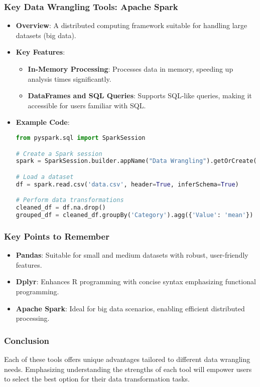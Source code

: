 \documentclass[aspectratio=169]{beamer}
\begin{document}
\begin{frame}[fragile]
    \frametitle{Key Data Wrangling Tools: Apache Spark}
    \begin{itemize}
        \item \textbf{Overview}: A distributed computing framework suitable for handling large datasets (big data).
        \item \textbf{Key Features}:
        \begin{itemize}
            \item \textbf{In-Memory Processing}: Processes data in memory, speeding up analysis times significantly.
            \item \textbf{DataFrames and SQL Queries}: Supports SQL-like queries, making it accessible for users familiar with SQL.
        \end{itemize}
        \item \textbf{Example Code}:
        \begin{lstlisting}[language=Python]
from pyspark.sql import SparkSession

# Create a Spark session
spark = SparkSession.builder.appName("Data Wrangling").getOrCreate()

# Load a dataset
df = spark.read.csv('data.csv', header=True, inferSchema=True)

# Perform data transformations
cleaned_df = df.na.drop()
grouped_df = cleaned_df.groupBy('Category').agg({'Value': 'mean'})
        \end{lstlisting}
    \end{itemize}
\end{frame}

\begin{frame}
    \frametitle{Key Points to Remember}
    \begin{itemize}
        \item \textbf{Pandas}: Suitable for small and medium datasets with robust, user-friendly features.
        \item \textbf{Dplyr}: Enhances R programming with concise syntax emphasizing functional programming.
        \item \textbf{Apache Spark}: Ideal for big data scenarios, enabling efficient distributed processing.
    \end{itemize}
\end{frame}

\begin{frame}
    \frametitle{Conclusion}
    Each of these tools offers unique advantages tailored to different data wrangling needs. Emphasizing understanding the strengths of each tool will empower users to select the best option for their data transformation tasks.
\end{frame}
\end{document}
